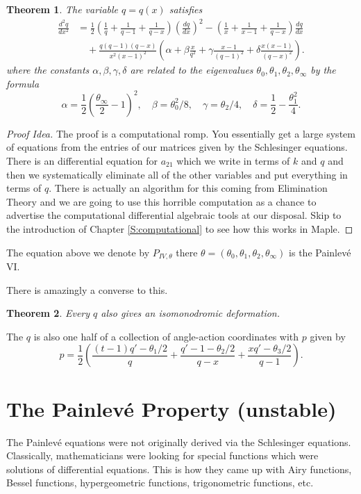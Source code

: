 \documentclass[12pt]{book}
\numberwithin{equation}{section}
\newtheorem{theorem}{Theorem}[subsection]
\theoremstyle{definition}
\theoremstyle{remark}
\begin{document}
\begin{theorem}
	The variable $q =q(x)$ satisfies 
	\begin{align*}\frac{d^2q}{dx^2}&=
	\frac{1}{2}\left(\frac{1}{q}+\frac{1}{q-1}+\frac{1}{q-x}\right)\left( \frac{dq}{dx} \right)^2
	-\left(\frac{1}{x}+\frac{1}{x-1}+\frac{1}{q-x}\right)\frac{dq}{dx} \\&\quad +
	\frac{q(q-1)(q-x)}{x^2(x-1)^2}
	\left(\alpha+\beta\frac{x}{q^2}+\gamma\frac{x-1}{(q-1)^2}+\delta\frac{x(x-1)}{(q-x)^2}\right).
	\end{align*}
	where the constants $\alpha,\beta,\gamma,\delta$ are related to the eigenvalues $\theta_0,\theta_1,\theta_2,\theta_{\infty}$ by the formula
	$$ \alpha = \frac{1}{2}\left( \frac{\theta_{\infty}}{2}- 1 \right)^2, \quad \beta = \theta_0^2/8, \quad \gamma = \theta_2/4, \quad \delta = \frac{1}{2}-\frac{\theta_1^2}{4}.$$
\end{theorem}
\begin{proof}[Proof Idea]
	The proof is a computational romp. 
	You essentially get a large system of equations from the entries of our matrices given by the Schlesinger equations.
	There is an differential equation for $a_{21}$ which we write in terms of $k$ and $q$ and then we systematically eliminate all of the other variables and put everything in terms of $q$. 
	There is actually an algorithm for this coming from Elimination Theory and we are going to use this horrible computation as a chance to advertise the computational differential algebraic tools at our disposal.
	Skip to the introduction of Chapter \ref{S:computational} to see how this works in \textsf{Maple}.
\end{proof}
The equation above we denote by $P_{IV,\theta}$ there $\theta=(\theta_0,\theta_1,\theta_2,\theta_{\infty})$ is the Painlev\'e VI.

There is amazingly a converse to this. 
\begin{theorem}
Every $q$ also gives an isomonodromic deformation.
\end{theorem}

The $q$ is also one half of a collection of angle-action coordinates with $p$ given by 
$$ p = \frac{1}{2}\left( \frac{(t-1)q'-\theta_1/2}{q} + \frac{q'-1-\theta_2/2}{q-x} + \frac{xq'-\theta_3/2}{q-1} \right). $$




\section{The Painlev\'e Property (unstable)}
The Painlev\'e equations were not originally derived via the Schlesinger equations. 
Classically, mathematicians were looking for special functions which were solutions of differential equations.
This is how they came up with Airy functions, Bessel functions, hypergeometric functions, trigonometric functions, etc.
\end{document}
